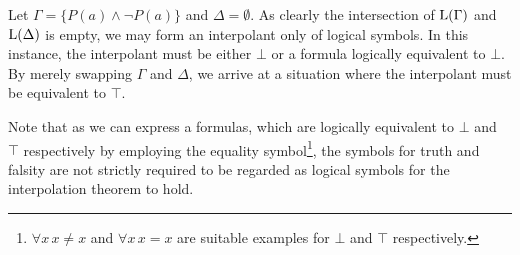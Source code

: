 \begin{exa}
	Let $\Gamma = \{ P(a) \land \lnot P(a) \} $ and $\Delta = \emptyset$.
	As clearly the intersection of $\operatorname{L}(\Gamma)$ and $\operatorname{L}(\Delta)$ is empty, we may form an interpolant only of logical symbols.
	In this instance, the interpolant must be either $\bot$ or a formula logically equivalent to $\bot$.
	By merely swapping $\Gamma$ and $\Delta$, we arrive at a situation where the interpolant must be equivalent to $\top$.

	Note that as we can express a formulas, which are logically equivalent to $\bot$ and $\top$ respectively by employing the equality symbol\footnote{$\forall x\,x\neq x$ and $\forall x\,x=x$ are suitable examples for $\bot$ and $\top$ respectively.}, the symbols for truth and falsity are not strictly required to be regarded as logical symbols for the interpolation theorem to hold.
\end{exa}
